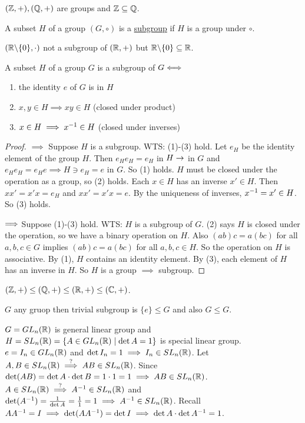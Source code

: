 \documentclass[]{article}
\begin{document}
\begin{example}
	$(\mathbb{Z},+),(\mathbb{Q},+)$ are groups and $\mathbb{Z}\subseteq\mathbb{Q}$.
\end{example}
\begin{definition}
	A subset $H$ of a group $(G,\circ)$ is a \ul{subgroup} if $H$ is a group under $\circ$.
\end{definition}
\begin{example}
	$(\mathbb{R}\backslash\{0\},\cdot)$ not a subgroup of $(\mathbb{R},+)$ but $\mathbb{R}\backslash\{0\}\subseteq\mathbb{R}$.
\end{example}
\begin{proposition}
	A subset $H$ of a group $G$ is a subgroup of $G \Longleftrightarrow$
	\begin{enumerate}
		\item the identity $e$ of $G$ is in $H$
		\item $x,y\in H \implies xy\in H$ (closed under product)
		\item $x\in H \implies x^{-1}\in H$ (closed under inverses)
	\end{enumerate}
\end{proposition}
\begin{proof}
	\ul{$\implies$} Suppose $H$ is a subgroup.
	WTS: (1)-(3) hold.
	Let $e_H$ be the identity element of the group $H$. Then $e_He_H = e_H$ in $H \rightarrow$ in $G$ and $e_H e_H = e_H e \implies H\ni e_H = e$ in $G$. So (1) holds.
	$H$ must be closed under the operation as a group, so (2) holds.
	Each $x\in H$ has an inverse $x'\in H$. Then $xx' = x'x = e_H$ and $xx' = x'x = e$. By the uniqueness of inverses, $x^{-1} = x'\in H$. So (3) holds.

	\ul{$\Longrightarrow$} Suppose (1)-(3) hold. WTS: $H$ is a subgroup of $G$.
	(2) says $H$ is closed under the operation, so we have a binary operation on $H$.
	Also $(ab)c = a(bc)$ for all $a,b,c\in G$ implies $(ab)c = a(bc)$ for all $a,b,c\in H$. So the operation on $H$ is associative.
	By (1), $H$ contains an identity element. By (3), each element of $H$ has an inverse in $H$.
	So $H$ is a group $\implies$ subgroup.
\end{proof}
\begin{example}
	$(\mathbb{Z},+)\leq (\mathbb{Q},+)\leq(\mathbb{R},+)\leq(\mathbb{C},+)$.
\end{example}
\begin{example}
	$G$ any gruop then trivial subgroup is $\{e\}\leq G$ and also $G\leq G$.
\end{example}
\begin{example}
	$G = GL_n(\mathbb{R})$ is general linear group and $H = SL_n(\mathbb{R}) = \{A\in GL_n(\mathbb{R}) \mid \det A = 1\}$ is special linear group.
	$e = I_n\in GL_n(\mathbb{R})$ and $\det I_n = 1 \implies I_n\in SL_n(\mathbb{R})$.
	Let $A,B\in SL_n(\mathbb{R}) \overset{?}{\implies} AB\in SL_n(\mathbb{R})$. Since $\det(AB) = \det A \cdot \det B = 1\cdot 1 = 1 \implies AB\in SL_n(\mathbb{R})$.
	$A\in SL_n(\mathbb{R}) \overset{?}{\implies} A^{-1}\in SL_n(\mathbb{R})$ and $\det(A^{-1}) = \frac{1}{\det A} = \frac{1}{1} = 1\implies A^{-1}\in SL_n(\mathbb{R})$. Recall $AA^{-1} = I \implies \det(AA^{-1}) = \det I \implies \det A\cdot \det A^{-1} = 1$.
\end{example}
\end{document}
